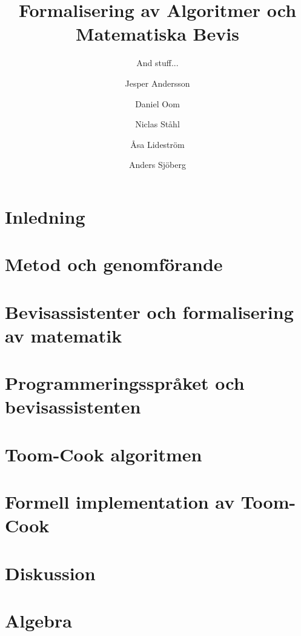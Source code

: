 \documentclass[bachelors,a4paper,gu]{chalmers-thesis}
\title{Formalisering av Algoritmer och Matematiska Bevis}
\subtitle{And stuff...}
\author{Jesper Andersson\and Daniel Oom\and Niclas Ståhl\and Åsa Lideström\and Anders Sjöberg}
\begin{document}
\maketitle

\chapter{Inledning}
\label{sec:inledning}


\newpage
\chapter{Metod och genomförande}
\label{sec:metod}


\newpage
\chapter{Bevisassistenter och formalisering av matematik}
\label{sec:formalisering}


\newpage
\chapter{Programmeringsspråket och bevisassistenten \coq}
\label{sec:coq}







\newpage
\chapter{Toom-Cook algoritmen}
\label{sec:toomcook}






\newpage
\chapter{Formell implementation av Toom-Cook}
\label{sec:formell}



\newpage
\chapter{Diskussion}
\label{sec:diskussion}






\newpage
\nocite{*}
\printbibliography

\appendix
\newpage
\chapter{Algebra}
\label{app:algebra}

\end{document}
